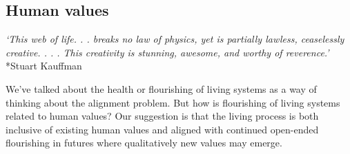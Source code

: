 \documentclass[12pt]{article}
\begin{document}







\subsection{Human values}

\begin{center}
\textit{`This web of life. . . breaks no law of physics, yet is partially lawless, ceaselessly \\creative. . . . This creativity is stunning, awesome, and worthy of reverence.'}\\*Stuart Kauffman
\end{center}

We've talked about the health or flourishing of living systems as a way of thinking about the alignment problem. But how is flourishing of living systems related to human values? Our suggestion is that the living process is both inclusive of existing human values and aligned with continued open-ended flourishing in futures where qualitatively new values may emerge. 
\end{document}
